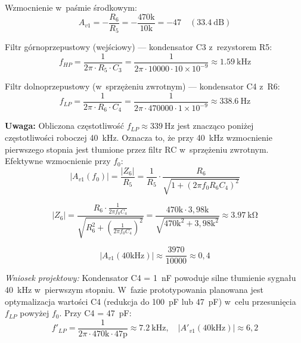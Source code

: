 \documentclass[a4paper,11pt]{article}
\begin{document}
Wzmocnienie w~paśmie środkowym:
\begin{equation}
    A_{v1} = -\frac{R_6}{R_5} = -\frac{470\text{k}}{10\text{k}} = -47 \quad (\SI{33,4}{\deci\bel})
    \label{eq:gain1}
\end{equation}

Filtr górnoprzepustowy (wejściowy) --- kondensator C3 z~rezystorem R5:
\begin{equation}
    f_{HP} = \frac{1}{2\pi \cdot R_5 \cdot C_3} = \frac{1}{2\pi \cdot 10000 \cdot 10 \times 10^{-9}} \approx \SI{1,59}{\kilo\hertz}
    \label{eq:fhp}
\end{equation}

Filtr dolnoprzepustowy (w~sprzężeniu zwrotnym) --- kondensator C4 z~R6:
\begin{equation}
    f_{LP} = \frac{1}{2\pi \cdot R_6 \cdot C_4} = \frac{1}{2\pi \cdot 470000 \cdot 1 \times 10^{-9}} \approx \SI{338,6}{\hertz}
    \label{eq:flp_raw}
\end{equation}

\textbf{Uwaga:} Obliczona częstotliwość $f_{LP} \approx \SI{339}{\hertz}$ jest
znacząco poniżej częstotliwości roboczej \SI{40}{\kilo\hertz}. Oznacza to, że
przy \SI{40}{\kilo\hertz} wzmocnienie pierwszego stopnia jest tłumione przez
filtr RC w~sprzężeniu zwrotnym. Efektywne wzmocnienie przy $f_0$:
\begin{equation}
    |A_{v1}(f_0)| = \frac{|Z_6|}{R_5} = \frac{1}{R_5} \cdot \frac{R_6}{\sqrt{1 + (2\pi f_0 R_6 C_4)^2}}
    \label{eq:gain1_f0}
\end{equation}

\begin{equation}
    |Z_6| = \frac{R_6 \cdot \frac{1}{2\pi f_0 C_4}}{\sqrt{R_6^2 + \left(\frac{1}{2\pi f_0 C_4}\right)^2}}
    = \frac{470\text{k} \cdot 3{,}98\text{k}}{\sqrt{470\text{k}^2 + 3{,}98\text{k}^2}} \approx \SI{3,97}{\kilo\ohm}
    \label{eq:z6}
\end{equation}

\begin{equation}
    |A_{v1}(40\text{kHz})| \approx \frac{3970}{10000} \approx 0{,}4
    \label{eq:gain1_actual}
\end{equation}

\textit{Wniosek projektowy:} Kondensator C4 = \SI{1}{\nano\farad} powoduje
silne tłumienie sygnału \SI{40}{\kilo\hertz} w~pierwszym stopniu. W~fazie
prototypowania planowana jest optymalizacja wartości C4 (redukcja do
\SI{100}{\pico\farad} lub \SI{47}{\pico\farad}) w~celu przesunięcia $f_{LP}$
powyżej $f_0$. Przy C4 = \SI{47}{\pico\farad}$:$
\begin{equation}
    f'_{LP} = \frac{1}{2\pi \cdot 470\text{k} \cdot 47\text{p}} \approx \SI{7,2}{\kilo\hertz}, \quad
    |A'_{v1}(40\text{kHz})| \approx 6{,}2
    \label{eq:gain1_opt}
\end{equation}
\end{document}
